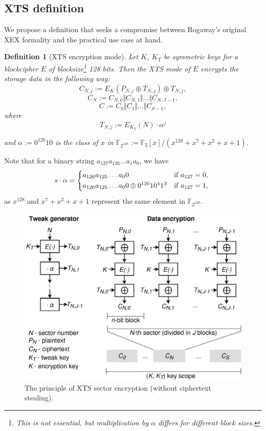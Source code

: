 \documentclass[a4paper]{article}
\newtheorem{definition}{Definition}
\begin{document}
\subsection{XTS definition}
We propose a definition that seeks a compromise between Rogaway's original XEX formality and the practical use case at hand.
\begin{definition}[XTS encryption mode]\label{xts}
    Let $K$, $K_T$ be symmetric keys for a blockcipher $E$ of blocksize\footnote{This is not essential, but multiplication by $\alpha$ differs for different block sizes.} 128 bits. Then the XTS mode of $E$ encrypts the storage data in the following way:
    $$C_{N,j} := 
    E_K(P_{N,j} \oplus T_{N,j}) \oplus T_{N,j},$$
    $$C_N := C_{N,0} \Vert C_{N,1} \Vert \dots \Vert C_{N,J-1},$$
    $$C := C_0 \Vert C_1 \Vert \dots \Vert C_{S-1},$$
    where $$T_{N,j} := E_{K_T}(N) \cdot \alpha ^ j$$

    and $\alpha := 0^{126}10$ is the class of $x$ in $\mathbb{F}_{2^{128}}:= \mathbb{F}_{2}[x]/(x^{128} + x^7 + x^2 + x + 1)$.
\end{definition}

Note that for a binary string $a_{127}a_{126}\dots a_1a_0$, we have
\[ s\cdot \alpha = 
    \begin{cases*}
        a_{126}a_{125}\dots a_0 0 & if $a_{127} = 0$,  \\
        a_{126}a_{125}\dots a_0 0 \oplus 0^{120}10^41^3 & if $a_{127} = 1$,
    \end{cases*} \]%
as $x^{128}$ and $x^7 + x^2 + x + 1$ represent the same element in 
$\mathbb{F}_{2^{128}}$.
\newpage

\begin{figure}[ht]
\begin{center}
    \includegraphics[width=0.88\linewidth]{xts2.png}
    \caption{The principle of XTS sector encryption (without ciphertext stealing).}
    \label{fig:xts}
\end{center}
\end{figure}
\end{document}
